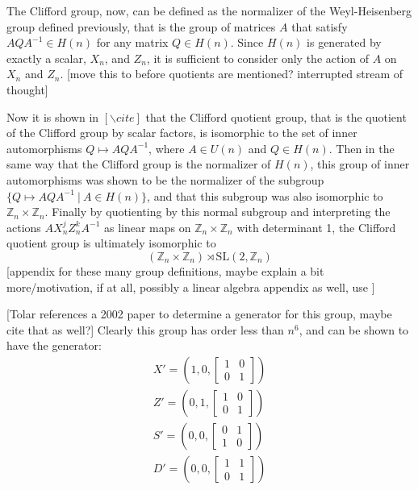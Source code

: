 \documentclass[]{article}
\begin{document}
The Clifford group, now, can be defined as the normalizer of the Weyl-Heisenberg group defined previously, that is the group of matrices $A$ that satisfy $AQA^{-1} \in H(n)$ for any matrix $Q \in H(n)$. Since $H(n)$ is generated by exactly a scalar, $X_n$, and $Z_n$, it is sufficient to consider only the action of $A$ on $X_n$ and $Z_n$. [move this to before quotients are mentioned? interrupted stream of thought]

Now it is shown in $[\backslash cite]$ that the Clifford quotient group, that is the quotient of the Clifford group by scalar factors, is isomorphic to the set of inner automorphisms $Q \mapsto AQA^{-1}$, where $A \in U(n)$ and $Q \in H(n)$. Then in the same way that the Clifford group is the normalizer of $H(n)$, this group of inner automorphisms was shown to be the normalizer of the subgroup $\{Q \mapsto AQA^{-1}\ |\ A \in H(n)\}$, and that this subgroup was also isomorphic to $\mathbb{Z}_n\times\mathbb{Z}_n$. Finally by quotienting by this normal subgroup and interpreting the actions $AX_n^jZ_n^kA^{-1}$ as linear maps on $\mathbb{Z}_n\times\mathbb{Z}_n$ with determinant 1, the Clifford quotient group is ultimately isomorphic to \[(\mathbb{Z}_n\times\mathbb{Z}_n)\rtimes\text{SL}(2,\mathbb{Z}_n)\]
[appendix for these many group definitions, maybe explain a bit more/motivation, if at all, possibly a linear algebra appendix as well, use ]

[Tolar references a 2002 paper to determine a generator for this group, maybe cite that as well?]
Clearly this group has order less than $n^6$, and can be shown to have the generator:
\begin{align*}
X' = \left(1, 0, \left[\begin{matrix}
1&0\\
0&1
\end{matrix}\right]\right)
\\
Z' = \left(0, 1, \left[\begin{matrix}
1&0\\
0&1
\end{matrix}\right]\right)
\\
S' = \left(0, 0, \left[\begin{matrix}
0&1\\
1&0
\end{matrix}\right]\right)
\\
D' = \left(0, 0, \left[\begin{matrix}
1&1\\
0&1
\end{matrix}\right]\right)
\end{align*}
\end{document}
